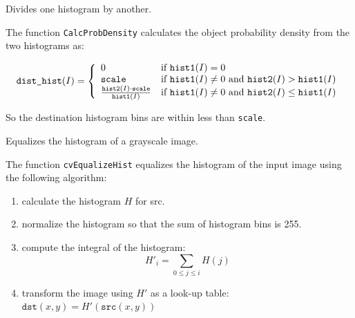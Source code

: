 \label{CalcProbDensity}

Divides one histogram by another.


\begin{description}
\end{description}

The function \texttt{CalcProbDensity} calculates the object probability density from the two histograms as:

\[
\texttt{dist\_hist}(I)=
\left\{ \begin{array}{l l} 0 & \mbox{if $\texttt{hist1}(I)=0$}\\ \texttt{scale} & \mbox{if $\texttt{hist1}(I) \ne 0$ and $\texttt{hist2}(I) > \texttt{hist1}(I)$}\\ \frac{\texttt{hist2}(I) \cdot \texttt{scale}}{\texttt{hist1}(I)} & \mbox{if $\texttt{hist1}(I) \ne 0$ and $\texttt{hist2}(I) \le \texttt{hist1}(I)$}\\ \end{array} \right.
\]

So the destination histogram bins are within less than \texttt{scale}.

\label{EqualizeHist}

Equalizes the histogram of a grayscale image.


\begin{description}
\end{description}

The function \texttt{cvEqualizeHist} equalizes the histogram of the input image using the following algorithm:

\begin{enumerate}
\item calculate the histogram $H$ for src.
\item normalize the histogram so that the sum of histogram bins is 255.
\item compute the integral of the histogram:
\[
H'_i = \sum_{0 \le j \le i} H(j)
\]
\item transform the image using $H'$ as a look-up table: $\texttt{dst}(x,y) = H'(\texttt{src}(x,y))$
\end{enumerate}

